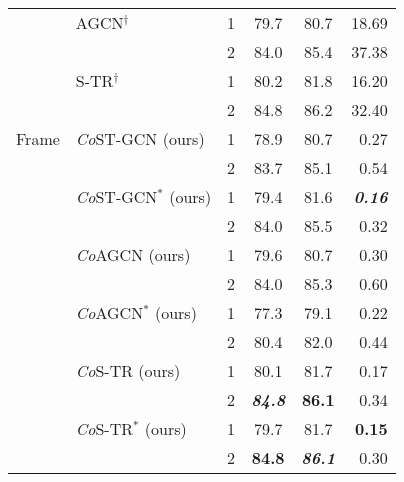 \documentclass[journal]{IEEEtran}
\newcommand\paretocolor{lgreen!20}
\theoremstyle{definition}
\begin{document}
\begin{table}[!tbp]
\begin{center}
{\begin{tabular}{llcccr}
    & AGCN$^\dagger$                                & 1         & 79.7      & 80.7  & 18.69 \\
    &                                               & 2         & 84.0      & 85.4  & 37.38 \\
  
    & S-TR$^\dagger$                                & 1         & 80.2      & 81.8  & 16.20 \\ 
    &                                               & 2         & 84.8      & 86.2  & 32.40 \\

    \midrule
    Frame 
    & \textit{Co}ST-GCN (ours)                      & 1         & 78.9      & 80.7     & 0.27 \\
    &                                               & 2         & 83.7      & 85.1     & 0.54 \\
    & \textit{Co}ST-GCN$^*$ (ours)                  & 1         & 79.4      & 81.6     & \textbf{\textit{0.16}} \\
    &                                               & 2         & 84.0      & 85.5     & 0.32 \\
    & \textit{Co}AGCN (ours)                        & 1         & 79.6      & 80.7     & 0.30 \\
    &                                               & 2         & 84.0      & 85.3     & 0.60 \\
    & \textit{Co}AGCN$^*$ (ours)                    & 1         & 77.3      & 79.1     & 0.22 \\
    &                                               & 2         & 80.4      & 82.0     & 0.44 \\
    & \textit{Co}S-TR (ours)                        & 1         & \colorbox{\paretocolor}{80.1}      & 81.7     & \colorbox{\paretocolor}{0.17} \\
    &                                               & 2         & \textbf{\textit{84.8}}      & \colorbox{\paretocolor}{\textbf{86.1}}     & \colorbox{\paretocolor}{0.34} \\
    & \textit{Co}S-TR$^*$ (ours)                    & 1         & \colorbox{\paretocolor}{79.7}      & \colorbox{\paretocolor}{81.7}     & \colorbox{\paretocolor}{\textbf{0.15}} \\
    &                                               & 2         & \colorbox{\paretocolor}{\textbf{84.8}}      & \colorbox{\paretocolor}{\textbf{\textit{86.1}}}     & \colorbox{\paretocolor}{0.30} \\
    \bottomrule
\end{tabular}
}
\end{center}
\end{table}
\end{document}
